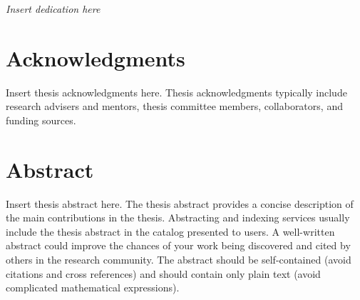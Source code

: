 {\centering
\null
\vspace*{1in}
\textit{Insert dedication here}
\par}

\clearpage


\chapter*{Acknowledgments}

Insert thesis acknowledgments here.
Thesis acknowledgments typically include research advisers and mentors, thesis committee members, collaborators, and funding sources.

\lipsum[1-2]

\clearpage


\chapter*{Abstract}

Insert thesis abstract here.
The thesis abstract provides a concise description of the main contributions in the thesis.
Abstracting and indexing services usually include the thesis abstract in the catalog presented to users.
A well-written abstract could improve the chances of your work being discovered and cited by others in the research community.
The abstract should be self-contained (avoid citations and cross references) and should contain only plain text (avoid complicated mathematical expressions).

\lipsum[1-6]

\clearpage


\tableofcontents

\listoffigures

\listoftables

\clearpage
